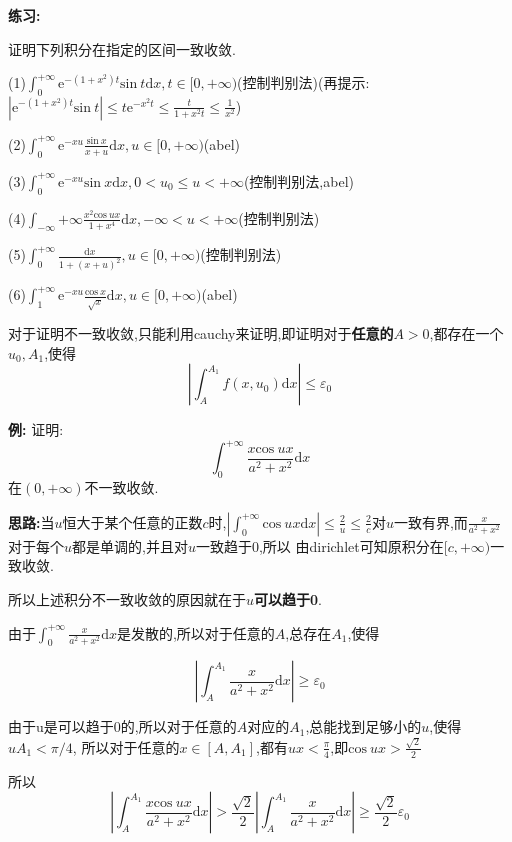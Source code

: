 \documentclass{ctexart}
\begin{document}
\textbf{练习:}

证明下列积分在指定的区间一致收敛.

(1)$\int_{0}^{+\infty}\mathrm{e}^{-(1+x^{2})t}\mathrm{sin}\ t\mathrm{d}x,t\in[0,+\infty)$(控制判别法)(再提示:$|\mathrm{e}^{-(1+x^{2})t}\mathrm{sin}\ t|\leq t\mathrm{e}^{-x^{2}t}\leq \frac{t}{1+x^{2}t}\leq \frac{1}{x^{2}}$)



(2)$\int_{0}^{+\infty}\mathrm{e}^{-xu}\frac{\mathrm{sin}\ x}{x+u}\mathrm{d}x,u\in[0,+\infty)$(abel)

(3)$\int_{0}^{+\infty}\mathrm{e}^{-xu}\mathrm{sin}\ x\mathrm{d}x,0<u_{0}\leq u<+\infty$(控制判别法,abel)

(4)$\int_{-\infty}{+\infty}\frac{x^{2}\mathrm{cos}\ ux}{1+x^{4}}\mathrm{d}x,-\infty<u<+\infty$(控制判别法)

(5)$\int_{0}^{+\infty}\frac{\mathrm{d}x}{1+(x+u)^{2}},u\in[0,+\infty)$(控制判别法)

(6)$\int_{1}^{+\infty}\mathrm{e}^{-xu}\frac{\mathrm{cos}\ x}{\sqrt{x}}\mathrm{d}x,u\in[0,+\infty)$(abel)

对于证明不一致收敛,只能利用cauchy来证明,即证明对于\textbf{任意的}$A>0$,都存在一个$u_{0},A_{1}$,使得$$\left|\int_{A}^{A_{1}}f(x,u_{0})\mathrm{d}x\right|\leq \varepsilon_{0}$$

\textbf{例:}  证明:$$\int_{0}^{+\infty}\frac{x\mathrm{cos}\ ux}{a^{2}+x^{2}}\mathrm{d}x$$在$(0,+\infty)$不一致收敛.

\textbf{思路:}当$u$恒大于某个任意的正数$c$时,$|\int_{0}^{+\infty}\mathrm{cos}\ ux\mathrm{d}x|\leq \frac{2}{u}\leq\frac{2}{c}$对$u$一致有界,而$\frac{x}{a^{2}+x^{2}}$对于每个$u$都是单调的,并且对$u$一致趋于0,所以 由dirichlet可知原积分在$[c,+\infty)$一致收敛.

所以上述积分不一致收敛的原因就在于$u$\textbf{可以趋于0}.

由于$\int_{0}^{+\infty}\frac{x}{a^{2}+x^{2}}\mathrm{d}x$是发散的,所以对于任意的$A$,总存在$A_{1}$,使得

$$\left|\int_{A}^{A_{1}}\frac{x}{a^{2}+x^{2}}\mathrm{d}x\right|\geq \varepsilon_{0}$$

由于u是可以趋于0的,所以对于任意的$A$对应的$A_{1}$,总能找到足够小的$u$,使得$uA_{1}<\pi/4$,
所以对于任意的$x\in[A,A_{1}]$,都有$ux<\frac{\pi}{4}$,即$\mathrm{cos}\ ux>\frac{\sqrt{2}}{2}$

所以$$\left|\int_{A}^{A_{1}}\frac{x\mathrm{cos}\ ux}{a^{2}+x^{2}}\mathrm{d}x\right|>\frac{\sqrt{2}}{2}\left|\int_{A}^{A_{1}}\frac{x}{a^{2}+x^{2}}\mathrm{d}x\right|\geq\frac{\sqrt{2}}{2}\varepsilon_{0}$$
\end{document}
